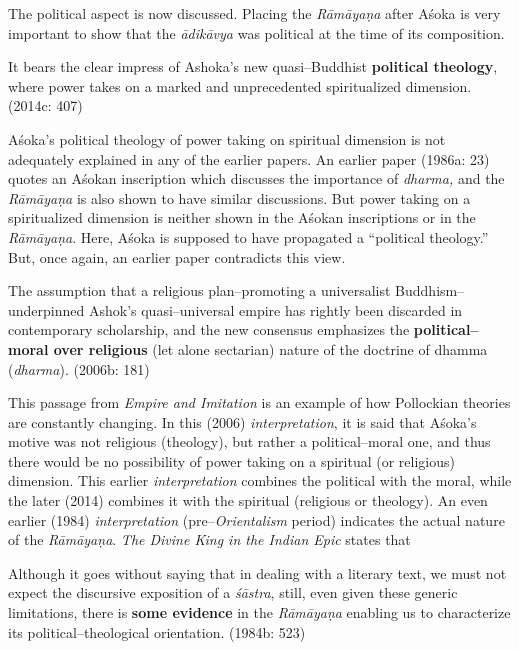 The political aspect is now discussed. Placing the \textit{Rāmāyaṇa }after Aśoka is very important to show that the \textit{ādikāvya} was political at the time of its composition.

\begin{myquote}
It bears the clear impress of Ashoka’s new quasi–Buddhist \textbf{political theology}, where power takes on a marked and unprecedented spiritualized dimension. (2014c: 407)
\end{myquote}

Aśoka’s political theology of power taking on spiritual dimension is not adequately explained in any of the earlier papers. An earlier paper (1986a: 23) quotes an Aśokan inscription which discusses the importance of \textit{dharma,} and the \textit{Rāmāyaṇa }is also shown to have similar discussions. But power taking on a spiritualized dimension is neither shown in the Aśokan inscriptions or in the \textit{Rāmāyaṇa}. Here, Aśoka is supposed to have propagated a “political theology.” But, once again, an earlier paper contradicts this view.

\begin{myquote}
The assumption that a religious plan–promoting a universalist Buddhism–underpinned Ashok’s quasi–universal empire has rightly been discarded in contemporary scholarship, and the new consensus emphasizes the \textbf{political–moral over religious} (let alone sectarian) nature of the doctrine of dhamma (\textit{dharma}). (2006b: 181)
\end{myquote}

This passage from \textit{Empire and Imitation} is an example of how Pollockian theories are constantly changing. In this (2006) \textit{interpretation}, it is said that Aśoka’s motive was not religious (theology), but rather a political–moral one, and thus there would be no possibility of power taking on a spiritual (or religious) dimension. This earlier \textit{interpretation} combines the political with the moral, while the later (2014) combines it with the spiritual (religious or theology). An even earlier (1984) \textit{interpretation} (pre–\textit{Orientalism} period) indicates the actual nature of the \textit{Rāmāyaṇa}. \textit{The Divine King in the Indian Epic} states that

\begin{myquote}
Although it goes without saying that in dealing with a literary text, we must not expect the discursive exposition of a \textit{śāstra}, still, even given these generic limitations, there is \textbf{some evidence} in the \textit{Rāmāyaṇa} enabling us to characterize its political–theological orientation. (1984b: 523)
\end{myquote}

